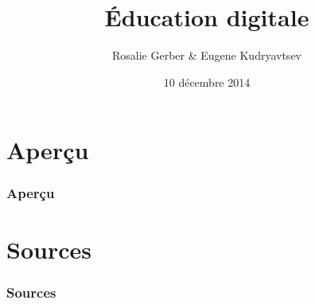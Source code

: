 \documentclass{beamer}
\title{Éducation digitale}
\author[Rosalie G. \& Eugene K.]{Rosalie Gerber \& Eugene Kudryavtsev}
\date{10 décembre 2014}
\institute[]{Haute école spécialisée bernoise}
\begin{document}
    \begin{frame}
        \titlepage
    \end{frame}

    \section*{Aperçu}
    \begin{frame}
        \frametitle{Aperçu}
        \tableofcontents
    \end{frame}

    \section*{Sources}
    \begin{frame}
        \frametitle{Sources}
    \end{frame}
    
\end{document}
